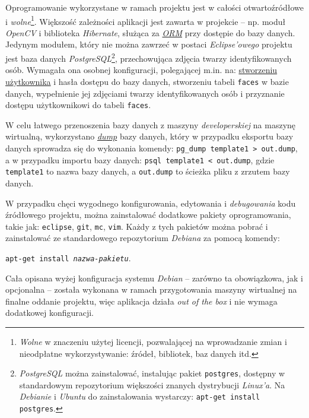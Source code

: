 \documentclass[a4paper,titlepage]{article}
\theoremstyle{break}
\numberwithin{equation}{subsection}
\begin{document}
Oprogramowanie wykorzystane w ramach projektu jest w całości otwartoźródłowe i \emph{wolne}\footnote{\emph{Wolne} w znaczeniu użytej licencji, pozwalającej na wprowadzanie zmian i nieodpłatne wykorzystywanie: źródeł, bibliotek, baz danych itd.}. Większość zależności aplikacji jest zawarta w projekcie -- np. moduł \emph{OpenCV} i biblioteka \emph{Hibernate}, służąca za \href{https://en.wikipedia.org/wiki/Object-relational_mapping}{\emph{ORM}} przy dostępie do bazy danych. Jedynym modułem, który nie można zawrzeć w postaci \emph{Eclipse'owego} projektu jest baza danych \emph{PostgreSQL}\footnote{\emph{PostgreSQL} można zainstalować, instalując pakiet \texttt{postgres}, dostępny w standardowym repozytorium większości znanych dystrybucji \emph{Linux'a}. Na \emph{Debianie} i \emph{Ubuntu} do zainstalowania wystarczy: \texttt{apt-get install postgres}.}, przechowująca zdjęcia twarzy identyfikowanych osób. Wymagała ona osobnej konfiguracji, polegającej m.in. na: \href{http://stackoverflow.com/questions/10861260/how-to-create-user-for-a-db-in-postgresql}{stworzeniu użytkownika} i hasła dostępu do bazy danych, stworzeniu tabeli \texttt{faces} w bazie danych, wypełnienie jej zdjęciami twarzy identyfikowanych osób i przyznanie dostępu użytkownikowi do tabeli \texttt{faces}.

W celu łatwego przenoszenia bazy danych z maszyny \emph{developerskiej} na maszynę wirtualną, wykorzystano \href{https://en.wikipedia.org/wiki/Database_dump}{\emph{dump}} bazy danych, który w przypadku eksportu bazy danych sprowadza się do wykonania komendy: \texttt{pg\_dump template1 > out.dump}, a w przypadku importu bazy danych: \texttt{psql template1 < out.dump}, gdzie \texttt{template1} to nazwa bazy danych, a \texttt{out.dump} to ścieżka pliku z zrzutem bazy danych.

W przypadku chęci wygodnego konfigurowania, edytowania i \emph{debugowania} kodu źródłowego projektu, można zainstalować dodatkowe pakiety oprogramowania, takie jak: \texttt{eclipse}, \texttt{git}, \texttt{mc}, \texttt{vim}. Każdy z tych pakietów można pobrać i zainstalować ze standardowego repozytorium \emph{Debiana} za pomocą komendy:
\begin{center}
\texttt{apt-get install \emph{nazwa-pakietu}}.
\end{center}

Cała opisana wyżej konfiguracja systemu \emph{Debian} -- zarówno ta obowiązkowa, jak i opcjonalna -- została wykonana w ramach przygotowania maszyny wirtualnej na finalne oddanie projektu, więc aplikacja działa \emph{out of the box} i nie wymaga dodatkowej konfiguracji.
\end{document}
